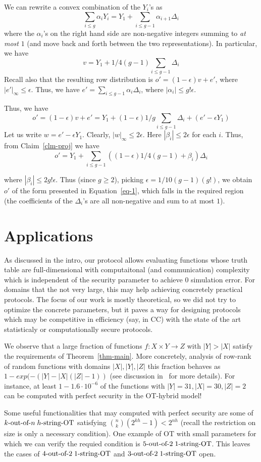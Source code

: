 \documentclass[a4paper]{article}
\newcommand{\sOT}[3]{#1\text{-out-of-}#2\text{\;$#3$-string-OT}}
\begin{document}
We can rewrite a convex combination of the $Y_i$'s as
\begin{equation}\label{eq-1}
\sum_{i\leq g}\alpha_iY_i=Y_1+\sum_{i\leq g-1}\alpha_{i+1} \Delta_i
\end{equation}
where the $\alpha_i$'s on the right hand side are non-negative integers summing to \emph{at most} $1$ (and move back and forth between the two representations). In particular, we have
\[v = Y_1+1/4(g-1)\sum_{i\leq g-1}\Delta_i\]
Recall also that the resulting row distribution is
$o'=(1-\epsilon)v + e'$, where $|e'|_\infty\leq \epsilon$.
Thus, we have $e'=\sum_{i\leq g-1}\alpha_i\Delta_i$, where $|\alpha_i|\leq g!\epsilon$. 

Thus, we have
\[o'=(1-\epsilon)v+e'=Y_1+(1-\epsilon)1/g\sum_{i\leq g-1}\Delta_i+(e'-\epsilon Y_1)\]
Let us write $w=e'-\epsilon Y_1$. Clearly, $|w|_\infty\leq 2\epsilon$.
Here $|\beta_i|\leq 2\epsilon$ for each $i$.
Thus, from Claim~\ref{clm-proj} we have
\[o'= Y_1+\sum_{i\leq g-1}((1-\epsilon)1/4(g-1)+\beta_i)\Delta_i\]

where $|\beta_i|\leq 2g!\epsilon$. Thus (since $g\geq 2$), picking $\epsilon=1/10(g-1)(g!)$, we obtain $o'$ of the form presented in Equation~\ref{eq-1}, which falls in the required region (the coefficients of the $\Delta_i$'s are all non-negative and sum to at most $1$). 

\section{Applications}

As discussed in the intro, our protocol allows evaluating functions whose truth table are full-dimensional with computaitonal (and communication) complexity which is independent of the security parameter to achieve 0 simulation error.
For domains that the not very large, this may help achieving concretely practical protocols. The focus of our work is mostly theoretical, so we did not try to optimize the concrete parameters, but it paves a way for designing protocols which may be competitive in efficiency (say, in CC) with the state of the art statisticaly or computationally secure protocols.

We observe that a large fraction of functions $f:X\times Y\rightarrow Z$ with $|Y|>|X|$ satisfy the requirements of Theorem~\ref{thm-main}. More concretely, analysis of row-rank of random functions with domains $|X|,|Y|,|Z|$ this fraction behaves
as $1-exp(-(|Y|-|X|(|Z|-1))$ (see discussion in~\cite{Ah14} for more details). For instance, at least $1-1.6\cdot 10^{-6}$ of the functions with $|Y|=31,|X|=30,|Z|=2$ can be computed with perfect security in the OT-hybrid model!

Some useful functionalities that may computed with perfect security are some of $\sOT{k}{n}{h}$ satisfying ${n \choose k} (2^{kh}-1) < 2^{nh}$ (recall the restriction on size is only a necessary condition).
One example of OT with small parameters for which we can verify the requied condition is $\sOT{5}{2}{1}$. This leaves the cases of $\sOT{4}{2}{1}$ and $\sOT{3}{2}{1}$ open.




\end{document}
